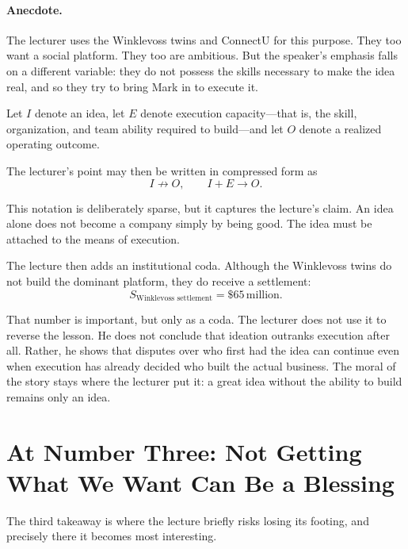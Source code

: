 \paragraph{Anecdote.}
The lecturer uses the Winklevoss twins and ConnectU for this purpose. They too want a social platform. They too are ambitious. But the speaker's emphasis falls on a different variable: they do not possess the skills necessary to make the idea real, and so they try to bring Mark in to execute it.

\begin{definition}
Let \(I\) denote an idea, let \(E\) denote execution capacity---that is, the skill, organization, and team ability required to build---and let \(O\) denote a realized operating outcome.
\end{definition}

The lecturer's point may then be written in compressed form as
\begin{equation}
I \not\longrightarrow O,
\qquad
I + E \longrightarrow O.
\end{equation}

This notation is deliberately sparse, but it captures the lecture's claim. An idea alone does not become a company simply by being good. The idea must be attached to the means of execution.

The lecture then adds an institutional coda. Although the Winklevoss twins do not build the dominant platform, they do receive a settlement:
\begin{equation}
S_{\text{Winklevoss settlement}} = \$65\,\text{million}.
\end{equation}

That number is important, but only as a coda. The lecturer does not use it to reverse the lesson. He does not conclude that ideation outranks execution after all. Rather, he shows that disputes over who first had the idea can continue even when execution has already decided who built the actual business. The moral of the story stays where the lecturer put it: a great idea without the ability to build remains only an idea.

\section{At Number Three: Not Getting What We Want Can Be a Blessing}

The third takeaway is where the lecture briefly risks losing its footing, and precisely there it becomes most interesting.

